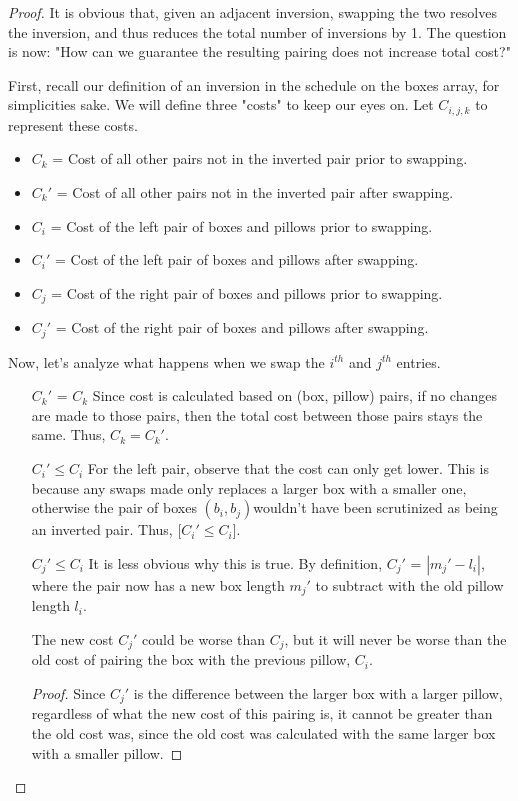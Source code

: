 \documentclass[11pt]{article}
\begin{document}
\begin{proof}
It is obvious that, given an adjacent inversion, swapping the two resolves the inversion, and thus reduces the total number of inversions by 1. The question is now: "How can we guarantee the resulting pairing does not increase total cost?"

First, recall our definition of an inversion in the schedule on the boxes array, for simplicities sake. We will define three "costs" to keep our eyes on. Let $C_{i,j,k}$ to represent these costs.

\begin{itemize}
\item $C_k$ = Cost of all other pairs not in the inverted pair prior to swapping.
\item $C_k'$ = Cost of all other pairs not in the inverted pair after swapping.
\item $C_i$ = Cost of the left pair of boxes and pillows prior to swapping.
\item $C_i'$ = Cost of the left pair of boxes and pillows after swapping.
\item $C_j$ = Cost of the right pair of boxes and pillows prior to swapping.
\item $C_j'$ = Cost of the right pair of boxes and pillows after swapping.
\end{itemize}

Now, let's analyze what happens when we swap the $i^{th}$ and $j^{th}$ entries.

\begin{itemize}
\item [$C_k'$ = $C_k$] Since cost is calculated based on (box, pillow) pairs, if no changes are made to those pairs, then the total cost between those pairs stays the same. Thus, $C_k = C_k'$.
\item [$C_i' \leq C_i$] For the left pair, observe that the cost can only get lower. This is because any swaps made only replaces a larger box with a smaller one, otherwise the pair of boxes $(b_i, b_j)$wouldn't have been scrutinized as being an inverted pair. Thus, [$C_i' \leq C_i$].
\item [$C_j' \leq C_i$] It is less obvious why this is true. By definition, $C_j'$ = $|m_j' - l_i|$, where the pair now has a new box length $m_j'$ to subtract with the old pillow length $l_i$. 
\begin{claim} The new cost $C_j'$ could be worse than $C_j$, but it will never be worse than the old cost of pairing the box with the previous pillow, $C_i$. \end{claim}
\begin{proof} 
Since $C_j'$ is the difference between the larger box with a larger pillow, regardless of what the new cost of this pairing is, it cannot be greater than the old cost was, since the old cost was calculated with the same larger box with a smaller pillow.
\end{proof}
\end{itemize}


\end{proof}
\end{document}
